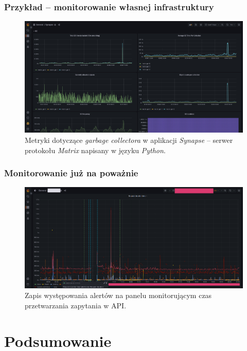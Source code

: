 \documentclass[]{beamer}
\begin{document}
\begin{frame}
  \frametitle{Przykład -- monitorowanie własnej infrastruktury}
  \begin{figure}
    \centering
    \includegraphics[width=1.0\linewidth]{grafana_matrix_python_gc.jpg}
    \caption{Metryki dotyczące \textit{garbage collectora} w aplikacji \textit{Synapse} -- serwer protokołu \textit{Matrix} napisany w języku \textit{Python}.}
  \end{figure}
\end{frame}

\begin{frame}
  \frametitle{Monitorowanie już na poważnie}
  \begin{figure}
    \centering
    \includegraphics[width=1.0\linewidth]{grafana_request_duration_incident_example.png}
    \caption{Zapis występowania alertów na panelu monitorującym czas przetwarzania zapytania w API.}
  \end{figure}
\end{frame}

\section{Podsumowanie}
\end{document}
